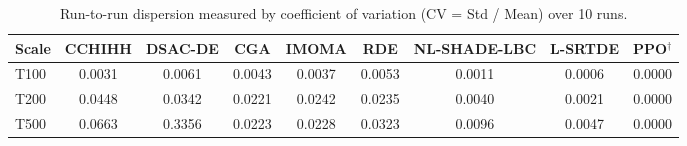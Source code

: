 \begin{table}[t]
\centering
\caption{Run-to-run dispersion measured by coefficient of variation (CV = Std / Mean) over 10 runs.}
\begin{tabular}{lcccccccc}
\toprule
Scale & CCHIHH & DSAC-DE & CGA & IMOMA & RDE & NL-SHADE-LBC & L-SRTDE & PPO$^\dagger$ \\
\midrule
T100 & 0.0031 & 0.0061 & 0.0043 & 0.0037 & 0.0053 & 0.0011 & 0.0006 & 0.0000 \\
T200 & 0.0448 & 0.0342 & 0.0221 & 0.0242 & 0.0235 & 0.0040 & 0.0021 & 0.0000 \\
T500 & 0.0663 & 0.3356 & 0.0223 & 0.0228 & 0.0323 & 0.0096 & 0.0047 & 0.0000 \\
\bottomrule
\end{tabular}
\end{table}
